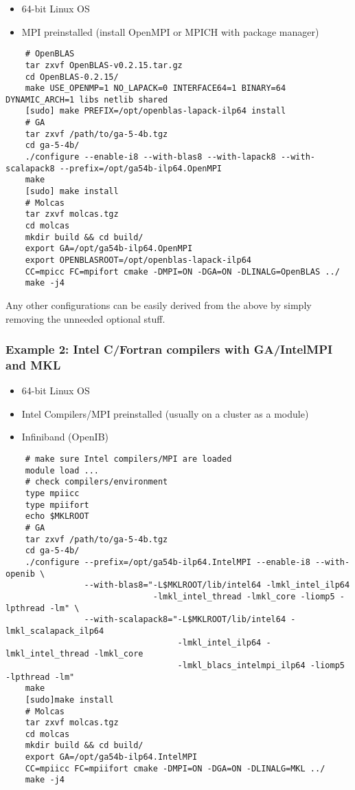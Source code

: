 \begin{itemize}
    \item 64-bit Linux OS
    \item MPI preinstalled (install OpenMPI or MPICH with package manager)
\end{itemize}

\begin{verbatim}
    # OpenBLAS
    tar zxvf OpenBLAS-v0.2.15.tar.gz
    cd OpenBLAS-0.2.15/
    make USE_OPENMP=1 NO_LAPACK=0 INTERFACE64=1 BINARY=64 DYNAMIC_ARCH=1 libs netlib shared
    [sudo] make PREFIX=/opt/openblas-lapack-ilp64 install
    # GA
    tar zxvf /path/to/ga-5-4b.tgz
    cd ga-5-4b/
    ./configure --enable-i8 --with-blas8 --with-lapack8 --with-scalapack8 --prefix=/opt/ga54b-ilp64.OpenMPI
    make
    [sudo] make install
    # Molcas
    tar zxvf molcas.tgz
    cd molcas
    mkdir build && cd build/
    export GA=/opt/ga54b-ilp64.OpenMPI
    export OPENBLASROOT=/opt/openblas-lapack-ilp64
    CC=mpicc FC=mpifort cmake -DMPI=ON -DGA=ON -DLINALG=OpenBLAS ../
    make -j4
\end{verbatim}

Any other configurations can be easily derived from the above by simply
removing the unneeded optional stuff.

\subsubsection{Example 2: Intel C/Fortran compilers with GA/IntelMPI and MKL}

\begin{itemize}
    \item 64-bit Linux OS
    \item Intel Compilers/MPI preinstalled (usually on a cluster as a module)
    \item Infiniband (OpenIB)
\end{itemize}

\begin{verbatim}
    # make sure Intel compilers/MPI are loaded
    module load ...
    # check compilers/environment
    type mpiicc
    type mpiifort
    echo $MKLROOT
    # GA
    tar zxvf /path/to/ga-5-4b.tgz
    cd ga-5-4b/
    ./configure --prefix=/opt/ga54b-ilp64.IntelMPI --enable-i8 --with-openib \
                --with-blas8="-L$MKLROOT/lib/intel64 -lmkl_intel_ilp64
                              -lmkl_intel_thread -lmkl_core -liomp5 -lpthread -lm" \
                --with-scalapack8="-L$MKLROOT/lib/intel64 -lmkl_scalapack_ilp64
                                   -lmkl_intel_ilp64 -lmkl_intel_thread -lmkl_core
                                   -lmkl_blacs_intelmpi_ilp64 -liomp5 -lpthread -lm"
    make
    [sudo]make install
    # Molcas
    tar zxvf molcas.tgz
    cd molcas
    mkdir build && cd build/
    export GA=/opt/ga54b-ilp64.IntelMPI
    CC=mpiicc FC=mpiifort cmake -DMPI=ON -DGA=ON -DLINALG=MKL ../
    make -j4
\end{verbatim}


